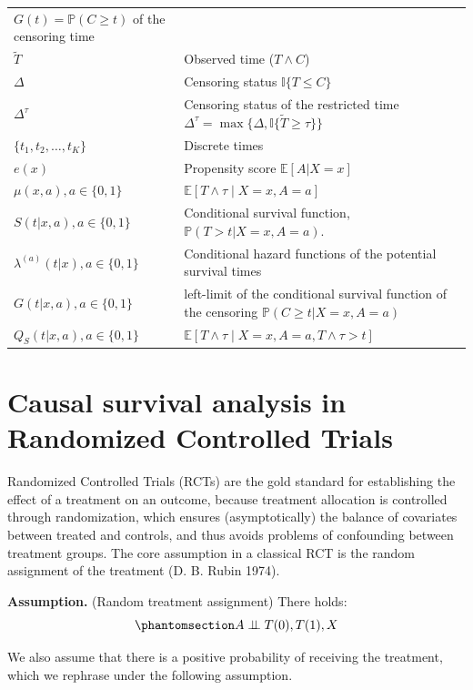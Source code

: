\documentclass[
  11pt,
  a4paper,
]{article}
\theoremstyle{plain}
\theoremstyle{plain}
\theoremstyle{plain}
\theoremstyle{definition}
\theoremstyle{remark}
\begin{document}
\begin{longtable}[]{@{}
  >{\raggedright\arraybackslash}p{}
  >{\raggedright\arraybackslash}p{}@{}}
\(G(t) =\mathbb{P}(C \geqslant t)\) of the censoring time \\
\(\widetilde{T}\) & Observed time (\(T \wedge C\)) \\
\(\Delta\) & Censoring status \(\mathbb{I}\{T \leqslant C \}\) \\
\(\Delta^{\tau}\) & Censoring status of the restricted time
\(\Delta^{\tau} = \max\{\Delta, \mathbb{I}\{\widetilde{T} \geqslant\tau\}\}\) \\
\(\{t_{1},t_{2},\dots,t_{K}\}\) & Discrete times \\
\(e(x)\) & Propensity score \(\mathbb{E} [A| X = x]\) \\
\(\mu(x,a), a \in \{0,1\}\) &
\(\mathbb{E}[T \wedge \tau \mid X=x,A=a ]\) \\
\(S(t|x,a), a \in \{0,1\}\) & Conditional survival function,
\(\mathbb{P}(T > t | X=x, A =a)\). \\
\(\lambda^{(a)}(t|x), a \in \{0,1\}\) & Conditional hazard functions of
the potential survival times \\
\(G(t|x,a), a \in \{0,1\}\) & left-limit of the conditional survival
function of the censoring \(\mathbb{P}(C\geqslant t|X=x,A=a)\) \\
\(Q_{S}(t|x,a), a \in \{0,1\}\) &
\(\mathbb{E}[T \wedge \tau \mid X=x,A=a, T \wedge \tau>t]\) \\
\end{longtable}

\section{Causal survival analysis in Randomized Controlled
Trials}\label{sec-theoryRCT}

Randomized Controlled Trials (RCTs) are the gold standard for
establishing the effect of a treatment on an outcome, because treatment
allocation is controlled through randomization, which ensures
(asymptotically) the balance of covariates between treated and controls,
and thus avoids problems of confounding between treatment groups. The
core assumption in a classical RCT is the random assignment of the
treatment (D. B. Rubin 1974).

\textbf{Assumption.} (Random treatment assignment) There holds:
\begin{equation}\phantomsection\label{eq-rta}{ 
A \perp\mkern-9.5mu\perp T(0),T(1),X
}\end{equation}

We also assume that there is a positive probability of receiving the
treatment, which we rephrase under the following assumption.
\end{document}

